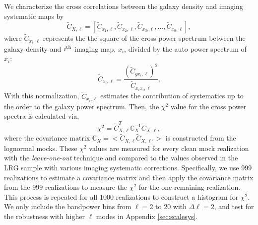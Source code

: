 We characterize the cross correlations between the galaxy density and imaging systematic maps by
\begin{equation}
\tilde{C}_{X, \ell} = [\tilde{C}_{x_{1}, \ell}, \tilde{C}_{x_{2}, \ell}, \tilde{C}_{x_{3}, \ell}, ..., \tilde{C}_{x_{9}, \ell}],
\end{equation}
where $\tilde{C}_{x_{i}, \ell}$ represents the the square of the cross power spectrum between the galaxy density and $i^{\rm th}$ imaging map, $x_{i}$, divided by the auto power spectrum of $x_{i}$:
\begin{equation}\label{eq:cx}
\tilde{C}_{x_{i}, \ell} = \frac{(\tilde{C}_{gx_{i}, \ell})^{2}}{\tilde{C}_{x_{i}x_{i},\ell}}.
\end{equation}
With this normalization, $\tilde{C}_{x_{i}, \ell}$ estimates the contribution of systematics  up to the  order to the galaxy power spectrum. Then, the $\chi^{2}$ value for the cross power spectra is calculated via,
\begin{equation}\label{eq:cx_chi2}
\chi^{2} = \tilde{C}^{T}_{X, \ell} \mathbb{C}_{X}^{-1} \tilde{C}_{X, \ell},
\end{equation}
where the covariance matrix $\mathbb{C}_{X} = < \tilde{C}_{X, \ell} \tilde{C}_{X, \ell'} >$ is constructed from the lognormal mocks. These $\chi^{2}$ values are measured for every clean mock realization with the \textit{leave-one-out} technique and compared to the values observed in the LRG sample with various imaging systematic corrections. Specifically, we use 999 realizations to estimate a covariance matrix and then apply the covariance matrix from the 999 realizations to measure the $\chi^{2}$ for the one remaining realization. This process is repeated for all 1000 realizations to construct a histogram for $\chi^{2}$. We only include the bandpower bins from $\ell=2$ to $20$ with $\Delta\ell=2$, and test for the robustness with higher $\ell$ modes in Appendix \ref{sec:scalesys}. 

